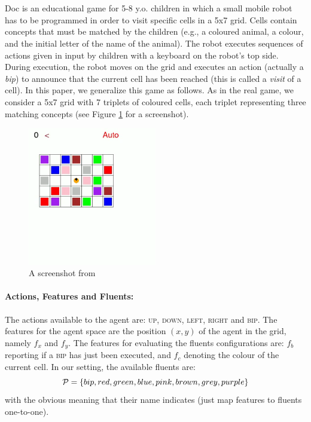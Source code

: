 \section{\Sapientino}
\Sapientino Doc is an educational
game for 5-8 y.o. children in which a small mobile robot
has to be programmed in order to visit specific cells in a 5x7
grid. Cells contain concepts that must be matched by the
children (e.g., a coloured animal, a colour, and the initial letter
of the name of the animal). The robot executes sequences of actions given in input by children with a keyboard on the
robot's top side. During execution, the robot moves on the
grid and executes an action (actually a \emph{bip}) to announce that
the current cell has been reached (this is called a \emph{visit} of a
cell). In this paper, we
generalize this game as follows. As in the real game, we consider a 5x7 grid with 7 triplets of coloured cells, each triplet
representing three matching concepts (see Figure \ref{fig:sapientino-screenshot} for a screenshot).

\begin{figure}[h]
	\centering
	\includegraphics[width=0.5\textwidth]{images/sapientino-start-screen.png}
	\caption{A screenshot from \Sapientino}
	\label{fig:sapientino-screenshot}
\end{figure}

\paragraph{Actions, Features and Fluents:}  The actions available to the agent are: \textsc{up, down, left, right} and \textsc{bip}. The features for the agent space are the position $(x,y)$ of the agent in the grid, namely $f_x$ and $f_y$. The features for evaluating the fluents configurations are: $f_b$ reporting if a \textsc{bip} has just been executed, and $f_c$ denoting the colour of the current cell. In our setting, the available fluents are: $$\mathcal{P} = \{bip, red, green, blue, pink, brown, grey, purple\}$$ with the obvious meaning that their name indicates (just map features to fluents one-to-one).

